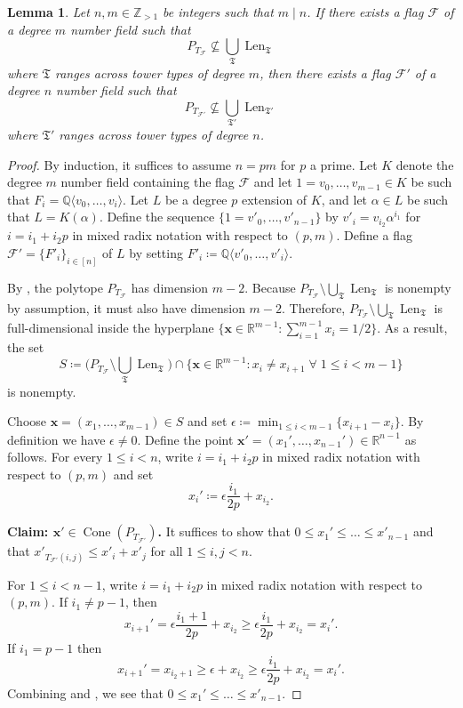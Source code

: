 \documentclass[letterpaper,10pt]{amsart}
\DeclareMathOperator{\Len}{Len}
\DeclareMathOperator{\Cone}{Cone}
\newcommand{\ZZ}{\mathbb{Z}}      %
\newcommand{\QQ}{\mathbb{Q}}      %
\newcommand{\RR}{\mathbb{R}}      %
\newcommand{\mfT}{\mathfrak{T}}
\newcommand{\la}{\langle}
\newcommand{\ra}{\rangle}
\newcommand{\cF}{\mathcal{F}}
\newtheorem{lemma}[theorem]{Lemma}
\theoremstyle{definition}
\theoremstyle{remark}
\begin{document}
\begin{lemma}
\label{lem:not-complete}
Let $n,m \in \ZZ_{>1}$ be integers such that $m \mid n$.
If there exists a flag $\cF$ of a degree $m$ number field such that 
\[
	P_{T_{\cF}} \not\subseteq \bigcup_{\mfT}\Len_{\mfT}
\]
where $\mfT$ ranges across tower types of degree $m$, then there exists a flag $\cF'$ of a degree $n$ number field such that 
\[
	P_{T_{\cF'}} \not\subseteq \bigcup_{\mfT'}\Len_{\mfT'}
\]
where $\mfT'$ ranges across tower types of degree $n$.
\end{lemma}
\begin{proof}
By induction, it suffices to assume $n = pm$ for $p$ a prime. Let $K$ denote the degree $m$ number field containing the flag $\cF$ and let $1 = v_0,\dots,v_{m-1} \in K$ be such that $F_i = \QQ\la v_0,\dots,v_{i} \ra$. Let $L$ be a degree $p$ extension of $K$, and let $\alpha \in L$ be such that $L=K(\alpha)$. Define the sequence $\{1 = v'_0,\dots,v'_{n-1} \}$  by $v'_i = v_{i_2}\alpha^{i_1}$ for $i = i_1 + i_2 p$ in mixed radix notation with respect to $(p,m)$. Define a flag $\cF' = \{F'_i\}_{i \in [n]}$ of $L$ by setting $F'_i \coloneqq \QQ \la v'_0,\dots,v'_i \ra$.

By , the polytope $P_{T_{\cF}}$ has dimension $m-2$. Because $P_{T_{\cF}} \setminus \bigcup_{\mfT}\Len_{\mfT}$ is nonempty by assumption, it must also have dimension $m - 2$. Therefore, $P_{T_{\cF}} \setminus \bigcup_{\mfT}\Len_{\mfT}$ is full-dimensional inside the hyperplane $\{\mathbf{x} \in \RR^{m-1} : \sum_{i = 1}^{m-1}x_i = 1/2\}$. As a result, the set
\[
	S \coloneqq \big(P_{T_{\cF}} \setminus \bigcup_{\mfT}\Len_{\mfT}\big) \cap \{\mathbf{x} \in \RR^{m-1} : x_i \neq x_{i+1} \; \forall  \; 1 \leq i < m-1 \}
\] 
is nonempty. 

Choose $\mathbf{x} = (x_1,\dots,x_{m-1}) \in S$ and set $\epsilon \coloneqq \min_{1 \leq i < m-1}\{x_{i+1} - x_i\}$. By definition we have $\epsilon \neq 0$. Define the point $\mathbf{x}' = (x_1',\dots,x_{n-1}') \in \RR^{n-1}$ as follows. For every $1 \leq i < n$, write $i = i_1 + i_2p$ in mixed radix notation with respect to $(p,m)$ and set
\[
	x_i' \coloneqq \epsilon \frac{i_1}{2p} + x_{i_2}.
\]

\noindent \textbf{Claim: $\mathbf{x}' \in \Cone(P_{T_{\cF'}})$.} It suffices to show that $0 \leq x_1' \leq \dots \leq x'_{n-1}$ and that $x'_{T_{\cF'}(i,j)} \leq x'_i + x'_j$ for all $1 \leq i,j < n$. 

For $1 \leq i < n-1$, write $i = i_1 + i_2 p$ in mixed radix notation with respect to $(p,m)$. If $i_1 \neq p-1$, then
\begin{equation}
\label{eqn:induction-1}
x_{i+1}' = \epsilon \frac{i_1 + 1}{2p} + x_{i_2} \geq  \epsilon \frac{i_1}{2p} + x_{i_2} = x_i'.
\end{equation}
If $i_1 = p-1$ then 
\begin{equation}
\label{eqn:induction-2}
x_{i+1}' = x_{i_2+1} \geq  \epsilon + x_{i_2} \geq \epsilon \frac{i_1}{2p} + x_{i_2} = x_i'.
\end{equation}
Combining  and , we see that  $0 \leq x_1' \leq \dots \leq x'_{n-1}$.


\end{proof}
\end{document}
